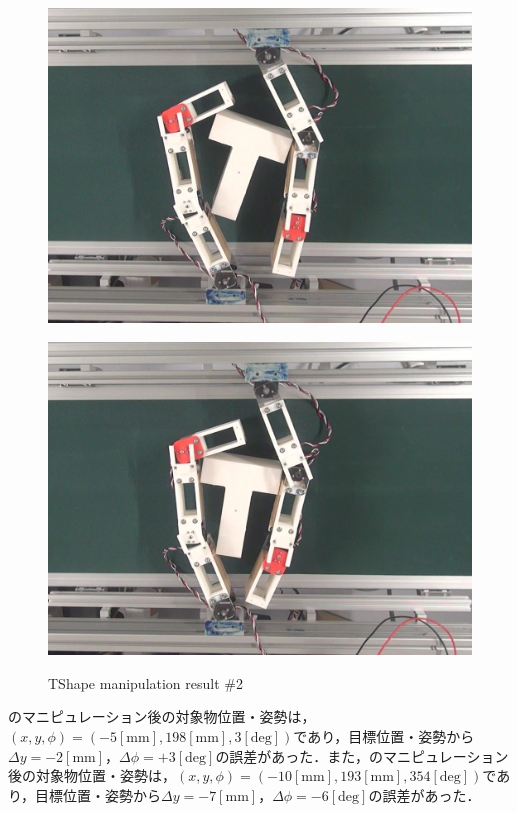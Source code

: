 \documentclass[a4paper,twoside,12pt,papersize, dvipdfmx]{iirthesis}
\begin{document}
\begin{figure}[hbt]
\begin{minipage}{0.249\hsize}
\includegraphics[width=0.98\hsize]{fig/4-manipulation-result/TShape/2-3.jpg}
\subcaption{}\label{}
\end{minipage}\hfill
\begin{minipage}{0.249\hsize}
\centering
\includegraphics[width=0.98\hsize]{fig/4-manipulation-result/TShape/2-4.jpg}
\subcaption{}\label{}
\end{minipage}
\caption{TShape manipulation result \#2}\label{fig::result::tm2}
\end{figure}

のマニピュレーション後の対象物位置・姿勢は，$(x, y, \phi) = (-5 \mathrm{[mm]}, 198 \mathrm{[mm]}, 3 \mathrm{[deg]})$であり，目標位置・姿勢から$\Delta y = -2 \mathrm{[mm]}$，$\Delta \phi = +3\mathrm{[deg]}$の誤差があった．また，のマニピュレーション後の対象物位置・姿勢は，$(x, y, \phi) = (-10 \mathrm{[mm]}, 193 \mathrm{[mm]}, 354 \mathrm{[deg]})$であり，目標位置・姿勢から$\Delta y = -7 \mathrm{[mm]}$，$\Delta \phi = -6 \mathrm{[deg]}$の誤差があった．\par
\end{document}
